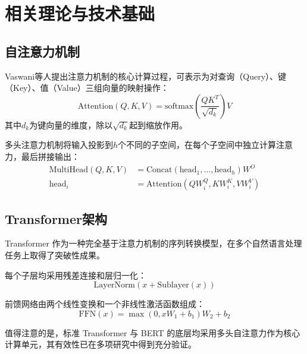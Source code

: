 \chapter{相关理论与技术基础}

\section{自注意力机制}

\zhlipsum[1]

Vaswani等人\cite{vaswani2017attention}提出注意力机制的核心计算过程，可表示为对查询（Query）、键（Key）、值（Value）三组向量的映射操作：
\begin{equation}
  \text{Attention}(Q, K, V) = \text{softmax}\!\left(\frac{QK^{T}}{\sqrt{d_k}}\right) V
  \label{eq:attention}
\end{equation}
其中$d_k$为键向量的维度，除以$\sqrt{d_k}$起到缩放作用。

\zhlipsum[2]

多头注意力机制将输入投影到$h$个不同的子空间，在每个子空间中独立计算注意力，最后拼接输出：
\begin{align}
  \text{MultiHead}(Q, K, V) &= \text{Concat}(\text{head}_1, \ldots, \text{head}_h) W^{O} \\
  \text{head}_i &= \text{Attention}(QW_i^{Q}, KW_i^{K}, VW_i^{V})
\end{align}

\section{Transformer架构}

\zhlipsum[14]
Transformer 作为一种完全基于注意力机制的序列转换模型，在多个自然语言处理任务上取得了突破性成果\cite{vaswani2017attention}。

每个子层均采用残差连接和层归一化：
\begin{equation}
  \text{LayerNorm}(x + \text{Sublayer}(x))
  \label{eq:layernorm}
\end{equation}

前馈网络由两个线性变换和一个非线性激活函数组成：
\begin{equation}
  \text{FFN}(x) = \max(0, xW_1 + b_1)W_2 + b_2
  \label{eq:ffn}
\end{equation}

\zhlipsum[5]

值得注意的是，标准 Transformer\cite{vaswani2017attention} 与 BERT\cite{devlin2019bert} 的底层均采用多头自注意力作为核心计算单元，其有效性已在多项研究中得到充分验证\cite{vaswani2017attention,devlin2019bert}。

